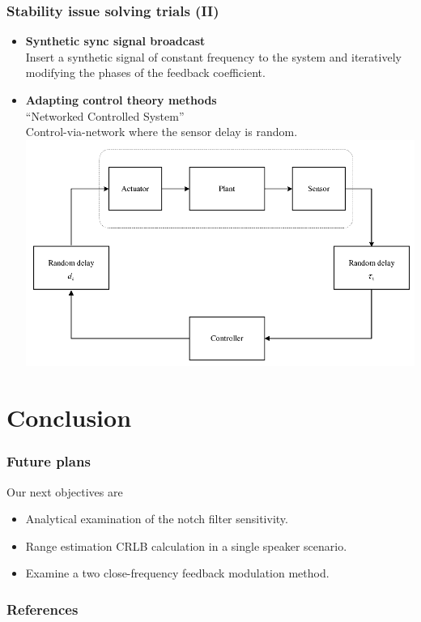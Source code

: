\documentclass[10pt,pdflatex,headrule,landscape]{beamer}
\begin{document}
\begin{frame}
\frametitle{Stability issue solving trials (II)}
\begin{itemize}
\item{
\textbf{Synthetic sync signal broadcast}
\\
Insert a synthetic signal of constant frequency to the system and iteratively modifying the phases of the feedback coefficient.
}
\item{
\textbf{Adapting control theory methods}
\\
``Networked Controlled System'' \cite{Luan2011StabilizationDelays,Lewis1998ControlDelays} 
\\
Control-via-network where the sensor delay is random.
\includegraphics[width=.6\textwidth]{Media/networkedControl.PNG}
}
\end{itemize}
\end{frame}

\section{Conclusion}

\begin{frame}
\frametitle{Future plans}
Our next objectives are
\begin{itemize}
\item{Analytical examination of the notch filter sensitivity.}
\item{Range estimation CRLB calculation in a single speaker scenario.}
\item{Examine a two close-frequency feedback modulation method.}
\end{itemize}
\end{frame}


\begin{frame}[allowframebreaks]
\frametitle{References}

\tiny{}
\end{frame}
\end{document}
